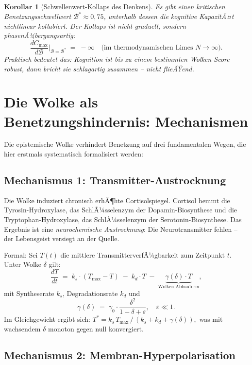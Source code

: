﻿\documentclass[12pt,a4paper]{report}
\theoremstyle{plain}
\newtheorem{korollar}[theorem]{Korollar}
\theoremstyle{definition}
\theoremstyle{remark}
\begin{document}
	\begin{korollar}[Schwellenwert-Kollaps des Denkens]
		\label{kor:kollaps}
		Es gibt einen kritischen Benetzungsschwellwert
		$\mathcal{B}^* \approx 0{,}75$, unterhalb dessen die kognitive
		KapazitÃ¤t nichtlinear kollabiert. Der Kollaps ist nicht graduell,
		sondern phasenÃ¼bergangsartig:
		\[
		\frac{dC_{\max}}{d\mathcal{B}}\bigg|_{\mathcal{B}=\mathcal{B}^*}
		\;=\; -\infty
		\quad\text{(im thermodynamischen Limes } N \to \infty\text{)}.
		\]
		Praktisch bedeutet das: Kognition ist bis zu einem bestimmten
		Wolken-Score robust, dann bricht sie schlagartig zusammen --
		nicht flieÃŸend.
	\end{korollar}

	\section{Die Wolke als Benetzungshindernis: Mechanismen}

	Die epistemische Wolke verhindert Benetzung auf drei fundamentalen
	Wegen, die hier erstmals systematisch formalisiert werden:

	\subsection{Mechanismus 1: Transmitter-Austrocknung}

	Die Wolke induziert chronisch erhÃ¶hte Cortisolspiegel.
	Cortisol hemmt die Tyrosin-Hydro\-xylase, das SchlÃ¼sselenzym der
	Dopamin-Biosynthese und die Tryptophan-Hydroxylase, das SchlÃ¼sselenzym der Serotonin-Biosynthese.
	Das Ergebnis ist eine \emph{neurochemische Austrocknung}:
	Die Neurotransmitter fehlen -- der Lebensgeist versiegt an der Quelle.

	Formal: Sei $T(t)$ die mittlere TransmitterverfÃ¼gbarkeit zum
	Zeitpunkt $t$. Unter Wolke $\delta$ gilt:
	\[
	\frac{dT}{dt} \;=\; k_s \cdot (T_{\max} - T)
	\;-\; k_d \cdot T
	\;-\; \underbrace{\gamma(\delta) \cdot T}_{\text{Wolken-Abbauterm}},
	\]
	mit Syntheserate $k_s$, Degradationsrate $k_d$ und
	\[
	\gamma(\delta) \;=\; \gamma_0 \cdot \frac{\delta^2}{1-\delta+\varepsilon},
	\quad \varepsilon \ll 1.
	\]
	Im Gleichgewicht ergibt sich:
	$T^* = k_s\,T_{\max}\,/\,(k_s + k_d + \gamma(\delta)),$
	was mit wachsendem $\delta$ monoton gegen null konvergiert.

	\subsection{Mechanismus 2: Membran-Hyperpolarisation}
\end{document}

